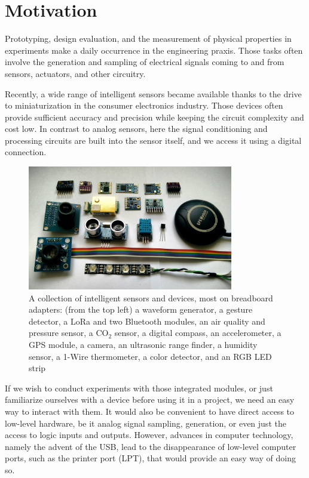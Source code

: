 \chapter{Motivation}

Prototyping, design evaluation, and the measurement of physical properties in experiments make a daily occurrence in the engineering praxis. Those tasks often involve the generation and sampling of electrical signals coming to and from sensors, actuators, and other circuitry.

Recently, a wide range of intelligent sensors became available thanks to the drive to miniaturization in the consumer electronics industry. Those devices often provide sufficient accuracy and precision while keeping the circuit complexity and cost low. In contrast to analog sensors, here the signal conditioning and processing circuits are built into the sensor itself, and we access it using a digital connection.

\begin{figure}[H]
	\centering
	\includegraphics[width=0.8\textwidth] {img/inteligent-sensors.jpg}
	\caption[A collection of intelligent sensors and devices]{A collection of intelligent sensors and devices, most on breadboard adapters: (from the top left) a waveform generator, a gesture detector, a LoRa and two Bluetooth modules, an air quality and pressure sensor, a CO$_2$ sensor, a digital compass, an accelerometer, a GPS module, a camera, an ultrasonic range finder, a humidity sensor, a 1-Wire thermometer, a color detector, and an RGB LED strip}
\end{figure}

If we wish to conduct experiments with those integrated modules, or just familiarize ourselves with a device before using it in a project, we need an easy way to interact with them. It would also be convenient to have direct access to low-level hardware, be it analog signal sampling, generation, or even just the access to logic inputs and outputs. However, advances in computer technology, namely the advent of the \gls{USB}, lead to the disappearance of low-level computer ports, such as the printer port (LPT), that would provide an easy way of doing so.

